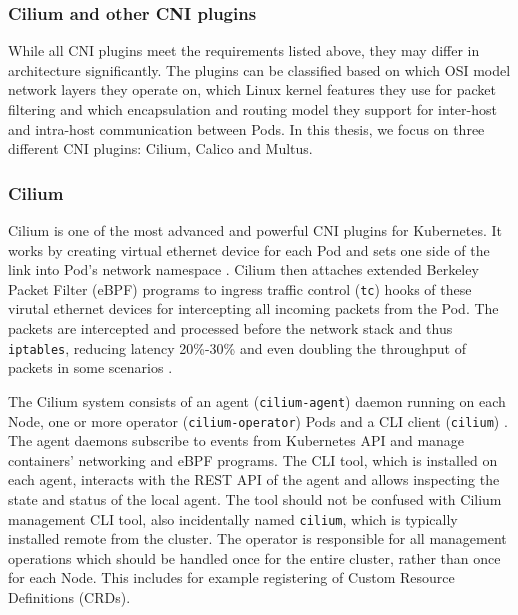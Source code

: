 \documentclass[english,12pt,a4paper,pdftex,sci,utf8]{aaltothesis}
\begin{document}
\subsubsection{Cilium and other CNI plugins}




While all CNI plugins meet the requirements listed above, they may differ in architecture significantly. The plugins can be classified based on which OSI model network layers they operate on, which Linux kernel features they use for packet filtering and which encapsulation and routing model they support for inter-host and intra-host communication between Pods. In this thesis, we focus on three different CNI plugins: Cilium, Calico and Multus.

\subsubsection{Cilium}

Cilium \cite{cilium} is one of the most advanced and powerful CNI plugins for Kubernetes. It works by creating virtual ethernet device for each Pod and sets one side of the link into Pod's network namespace \cite{cilium-tkng}. Cilium then attaches extended Berkeley Packet Filter (eBPF) programs to ingress traffic control (\texttt{tc}) hooks of these virutal ethernet devices for intercepting all incoming packets from the Pod. The packets are intercepted and processed before the network stack and thus \texttt{iptables}, reducing latency 20\%-30\% and even doubling the throughput of packets in some scenarios \cite{budigiri2021network}.

The Cilium system consists of an agent (\texttt{cilium-agent}) daemon running on each Node, one or more operator (\texttt{cilium-operator}) Pods and a CLI client (\texttt{cilium}) \cite{cilium-components}. The agent daemons subscribe to events from Kubernetes API and manage containers' networking and eBPF programs. The CLI tool, which is installed on each agent, interacts with the REST API of the agent and allows inspecting the state and status of the local agent. The tool should not be confused with Cilium management CLI tool, also incidentally named \texttt{cilium}, which is typically installed remote from the cluster. The operator is responsible for all management operations which should be handled once for the entire cluster, rather than once for each Node. This includes for example registering of Custom Resource Definitions (CRDs).
\end{document}

